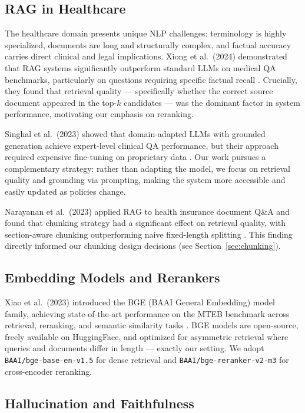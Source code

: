\documentclass[12pt, letterpaper]{article}
\begin{document}
\subsection{RAG in Healthcare}

The healthcare domain presents unique NLP challenges: terminology is highly specialized,
documents are long and structurally complex, and factual accuracy carries direct clinical
and legal implications. Xiong et al.\ (2024) demonstrated that RAG systems significantly
outperform standard LLMs on medical QA benchmarks, particularly on questions requiring
specific factual recall \cite{xiong2024}. Crucially, they found that retrieval quality ---
specifically whether the correct source document appeared in the top-$k$ candidates ---
was the dominant factor in system performance, motivating our emphasis on reranking.

Singhal et al.\ (2023) showed that domain-adapted LLMs with grounded generation achieve
expert-level clinical QA performance, but their approach required expensive fine-tuning
on proprietary data \cite{singhal2023medpalm}. Our work pursues a complementary strategy:
rather than adapting the model, we focus on retrieval quality and grounding via prompting,
making the system more accessible and easily updated as policies change.

Narayanan et al.\ (2023) applied RAG to health insurance document Q\&A and found that
chunking strategy had a significant effect on retrieval quality, with section-aware chunking
outperforming naive fixed-length splitting \cite{narayanan2023insurance}. This finding
directly informed our chunking design decisions (see Section~\ref{sec:chunking}).

\subsection{Embedding Models and Rerankers}

Xiao et al.\ (2023) introduced the BGE (BAAI General Embedding) model family, achieving
state-of-the-art performance on the MTEB benchmark across retrieval, reranking, and
semantic similarity tasks \cite{xiao2023bge}. BGE models are open-source, freely
available on HuggingFace, and optimized for asymmetric retrieval where queries and
documents differ in length --- exactly our setting. We adopt \texttt{BAAI/bge-base-en-v1.5}
for dense retrieval and \texttt{BAAI/bge-reranker-v2-m3} for cross-encoder reranking.

\subsection{Hallucination and Faithfulness}
\end{document}
